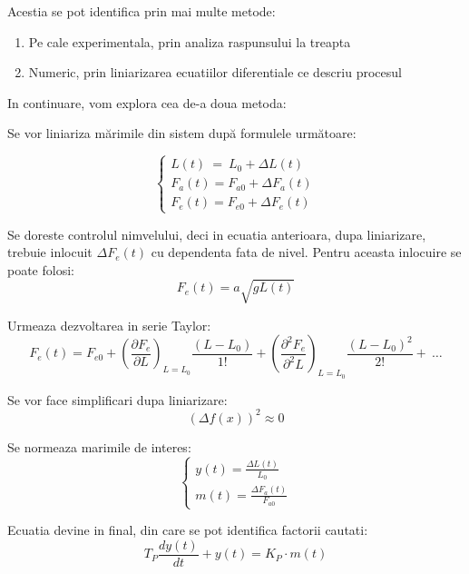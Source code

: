 \documentclass[12pt,english]{article}
\begin{document}
Acestia se pot identifica prin mai multe metode:
\begin{enumerate}
  \item Pe cale experimentala, prin analiza raspunsului la treapta
  \item Numeric, prin liniarizarea ecuatiilor diferentiale ce descriu procesul
\end{enumerate}

In continuare, vom explora cea de-a doua metoda:


Se vor liniariza mărimile din sistem după formulele următoare:
\begin{center}
  \begin{equation*}
  \begin{cases}
  L( t) \ =\ L_{0} +\Delta L( t)\\
  F_{a}( t) =F_{a0} +\Delta F_{a}( t)\\
  F_{e}( t) =F_{e0} +\Delta F_{e}( t)
  \end{cases}
  \end{equation*}
\end{center}

Se doreste controlul nimvelului, deci in ecuatia anterioara, dupa liniarizare, trebuie inlocuit $\Delta F_e(t)$ cu dependenta fata de nivel. Pentru aceasta inlocuire se poate folosi:
\begin{equation*}
F_{e}( t) =a\sqrt{gL( t)}
\end{equation*}

Urmeaza dezvoltarea in serie Taylor:
\begin{equation*}
F_{e}( t) =F_{e0} +\left(\dfrac{\partial F_{e}}{\partial L}\right)_{L=L_{0}}\frac{( L-L_{0})}{1!} +\left(\dfrac{\partial ^{2} F_{e}}{\partial ^{2} L}\right)_{L=L_{0}}\frac{( L-L_{0})^{2}}{2!} +\ \dotsc 
\end{equation*}

Se vor face simplificari dupa liniarizare:
\begin{equation*}
( \Delta f( x))^{2} \approx 0
\end{equation*}

Se normeaza marimile de interes:
\begin{equation*}
\begin{cases}
y( t) =\frac{\Delta L( t)}{L_{0}}\\
m( t) =\frac{\Delta F_{a}( t)}{F_{a0}}
\end{cases}
\end{equation*}

Ecuatia devine in final, din care se pot identifica factorii cautati:
\begin{equation*}
T_{P}\frac{dy( t)}{dt} +y( t) =K_{P} \cdot m( t)
\end{equation*}
\end{document}
